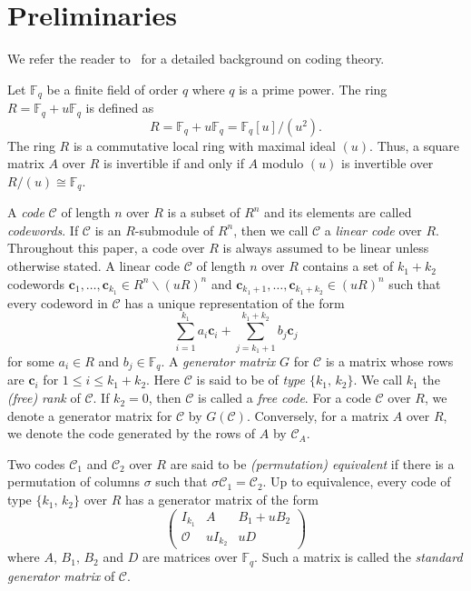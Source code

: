 \documentclass{article}
\theoremstyle{definition}
\theoremstyle{remark}
\begin{document}
\section{Preliminaries}
We refer the reader to~\cite{book-HP,book-MS} for a detailed background on coding theory.

Let $\mathbb{F}_q$ be a finite field of order $q$ where $q$ is a prime power. The ring $R=\mathbb{F}_q+u\mathbb{F}_q$ is defined as
\[
R=\mathbb{F}_q+u\mathbb{F}_q=\mathbb{F}_q[u]/(u^2).
\]
The ring $R$ is a commutative local ring with maximal ideal $(u)$. Thus, a square matrix $A$ over $R$ is invertible if and only if $A$ modulo $(u)$ is invertible over $R/(u)\cong\mathbb{F}_q$.

A \textit{code} $\mathcal{C}$ of length $n$ over $R$ is a subset of $R^n$ and its elements are called \textit{codewords}. If $\mathcal{C}$ is an $R$-submodule of $R^n$, then we call $\mathcal{C}$ a \textit{linear code} over $R$. Throughout this paper, a code over $R$ is always assumed to be linear unless otherwise stated. A linear code $\mathcal{C}$ of length $n$ over $R$ contains a set of $k_1+k_2$ codewords $\mathbf{c}_1, \ldots, \mathbf{c}_{k_1}\in R^n\backslash(uR)^n$ and $\mathbf{c}_{k_1+1}, \ldots, \mathbf{c}_{k_1+k_2}\in (uR)^n$ such that every codeword in $\mathcal{C}$ has a unique representation of the form
\[
\sum_{i=1}^{k_1}a_i\mathbf{c}_i+\sum_{j=k_1+1}^{k_1+k_2}b_j\mathbf{c}_j
\]
for some $a_i\in R$ and $b_j\in \mathbb{F}_q$. A \textit{generator matrix} $G$ for $\mathcal{C}$ is a matrix whose rows are $\mathbf{c}_i$ for $1\le i\le k_1+k_2$. Here $\mathcal{C}$ is said to be of \textit{type $\{k_1,\,k_2\}$}. We call $k_1$ the \textit{(free) rank} of $\mathcal{C}$. If $k_2=0$, then $\mathcal{C}$ is called a \textit{free code}. For a code $\mathcal{C}$ over $R$, we denote a generator matrix for $\mathcal{C}$ by $G(\mathcal{C})$. Conversely, for a matrix $A$ over $R$, we denote the code generated by the rows of $A$ by $\mathcal{C}_A$.

Two codes $\mathcal{C}_1$ and $\mathcal{C}_2$ over $R$ are said to be \textit{(permutation) equivalent} if there is a permutation of columns $\sigma$ such that $\sigma\mathcal{C}_1=\mathcal{C}_2$. Up to equivalence, every code of type $\{k_1,\,k_2\}$ over $R$ has a generator matrix of the form
\[
\begin{pmatrix}
I_{k_1} & A & B_1+uB_2\\\mathcal{O} & uI_{k_2} & uD
\end{pmatrix}
\]
where $A,\,B_1,\,B_2$ and $D$ are matrices over $\mathbb{F}_q$. Such a matrix is called the \textit{standard generator matrix} of $\mathcal{C}$.
\end{document}
